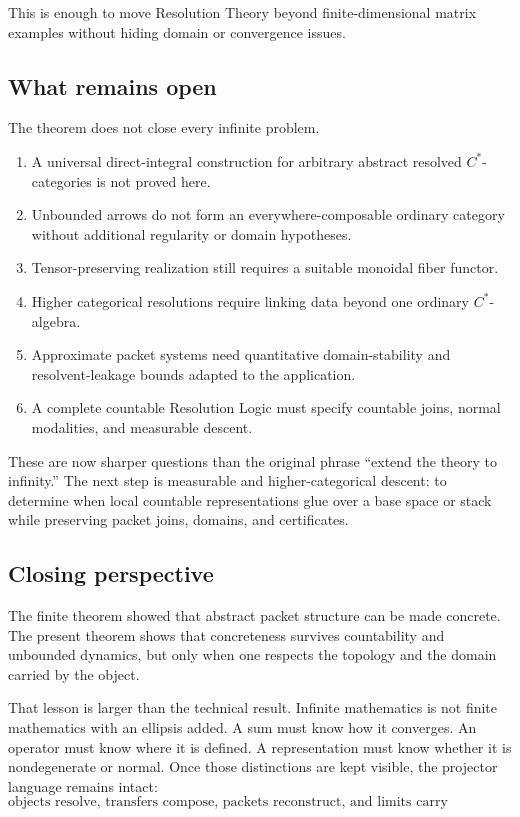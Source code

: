 \documentclass[11pt]{article}
\theoremstyle{definition}
\theoremstyle{remark}
\begin{document}
This is enough to move Resolution Theory beyond finite-dimensional matrix examples without hiding domain or convergence issues.

\subsection{What remains open}

The theorem does not close every infinite problem.

\begin{enumerate}[label=\arabic*.]
\item A universal direct-integral construction for arbitrary abstract resolved $C^*$-categories is not proved here.
\item Unbounded arrows do not form an everywhere-composable ordinary category without additional regularity or domain hypotheses.
\item Tensor-preserving realization still requires a suitable monoidal fiber functor.
\item Higher categorical resolutions require linking data beyond one ordinary $C^*$-algebra.
\item Approximate packet systems need quantitative domain-stability and resolvent-leakage bounds adapted to the application.
\item A complete countable Resolution Logic must specify countable joins, normal modalities, and measurable descent.
\end{enumerate}

These are now sharper questions than the original phrase ``extend the theory to infinity.''  The next step is measurable and higher-categorical descent: to determine when local countable representations glue over a base space or stack while preserving packet joins, domains, and certificates.

\subsection{Closing perspective}

The finite theorem showed that abstract packet structure can be made concrete.  The present theorem shows that concreteness survives countability and unbounded dynamics, but only when one respects the topology and the domain carried by the object.

That lesson is larger than the technical result.  Infinite mathematics is not finite mathematics with an ellipsis added.  A sum must know how it converges.  An operator must know where it is defined.  A representation must know whether it is nondegenerate or normal.  Once those distinctions are kept visible, the projector language remains intact:
\[
\boxed{
\text{objects resolve, transfers compose, packets reconstruct, and limits carry certificates.}
}
\]
\end{document}
